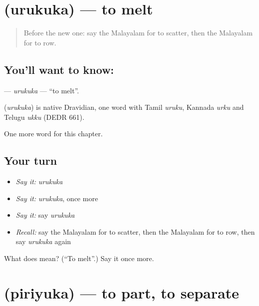 \section[\texorpdfstring{\ml{ഉരുകുക} (urukuka)}{ഉരുകുക (urukuka)}]{ (urukuka) — to melt}

\label{lesson:ML-C191-urukuka}



\begin{quote}
Before the new one: say the Malayalam for to scatter, then the Malayalam for to row.
\end{quote}

\subsection*{You'll want to know: }
\textbf{} — \emph{urukuka} — \textquotedblleft{}to melt\textquotedblright{}.

\begin{cousinweb}
\textbf{} (\emph{urukuka}) is native Dravidian, one word with Tamil \emph{uruku}, Kannada \emph{urku} and Telugu \emph{ukku} (DEDR 661).
\end{cousinweb}

\begin{grammarlens}[title={What you've built}]
One more word for this chapter.
\end{grammarlens}

\subsection*{Your turn}
\begin{itemize}
\raggedright
  \item \emph{Say it:} \emph{urukuka}
  \item \emph{Say it:} \emph{urukuka}, once more
  \item \emph{Say it:} say \emph{urukuka}
  \item \emph{Recall:} say the Malayalam for to scatter, then the Malayalam for to row, then say \emph{urukuka} again
\end{itemize}

\begin{tcolorbox}[breakable,colback=teal!4,colframe=teal!35!black,title={Before you move on}]
What does  mean? (\textquotedblleft{}To melt\textquotedblright{}.) Say it once more.
\end{tcolorbox}
\section[\texorpdfstring{\ml{പിരിയുക} (piriyuka)}{പിരിയുക (piriyuka)}]{ (piriyuka) — to part, to separate}

